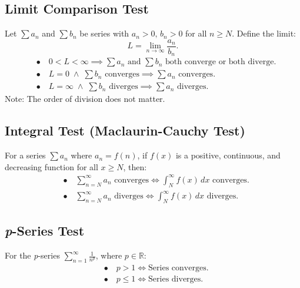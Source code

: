 \documentclass[a4paper,11pt]{article}
\theoremstyle{definition}
\theoremstyle{plain}
\theoremstyle{remark}
\begin{document}


\subsection{Limit Comparison Test}

\begin{tcolorbox}
    Let $\textstyle \sum a_n$ and $\textstyle \sum b_n$ be series with $a_n > 0,\, b_n > 0$ for all $n \geq N$. Define the limit:
    \[
    L = \lim_{n \to \infty} \frac{a_n}{b_n}.
    \]
    \[
    \begin{aligned}
        &\bullet \quad 0 < L < \infty \implies \sum a_n \text{ and } \sum b_n \text{ both converge or both diverge}. \\[8pt]  
        &\bullet \quad L = 0 \; \land \; \sum b_n \text{ converges} \implies \sum a_n \text{ converges}. \\[8pt]
        &\bullet \quad L = \infty \; \land \; \sum b_n \text{ diverges} \implies \sum a_n \text{ diverges}.
    \end{aligned}
    \]
    Note: The order of division does not matter.
\end{tcolorbox}




\subsection{Integral Test (Maclaurin-Cauchy Test)}

\begin{tcolorbox}
    For a series $\textstyle \sum a_n$ where $a_n = f(n)$, if $f(x)$ is a positive, continuous, and decreasing function for all $x \geq N$, then:
    \[
    \begin{aligned}
        &\bullet \quad \sum_{n=N}^{\infty} a_n \text{ converges} \iff \int_{N}^{\infty} f(x) \, dx \text{ converges}. \\[8pt]  
        &\bullet \quad \sum_{n=N}^{\infty} a_n \text{ diverges} \iff \int_{N}^{\infty} f(x) \, dx \text{ diverges}.
    \end{aligned}
    \]
\end{tcolorbox}



\subsection{\emph{p}-Series Test}

\begin{tcolorbox}
    For the \emph{p}-series $\sum_{n=1}^{\infty} \frac{1}{n^p}$, where $p \in \mathbb{R}$:
    \[
    \begin{aligned}
        &\bullet \quad p > 1 \iff \text{Series converges}. \\[8pt]  
        &\bullet \quad p \leq 1 \iff  \text{Series diverges}.
    \end{aligned}
    \]
\end{tcolorbox}
\end{document}
